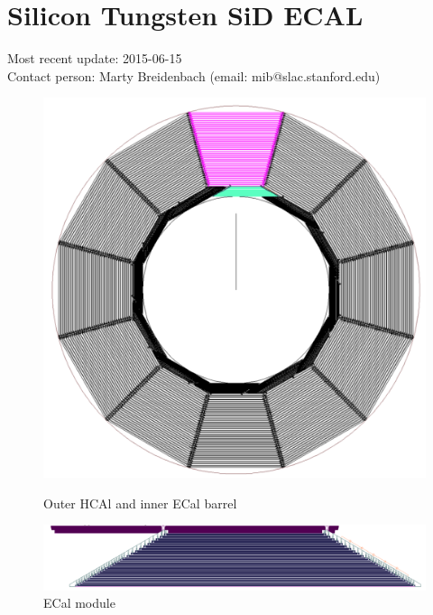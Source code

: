 \section{Silicon Tungsten SiD ECAL}\label{sec:Calorimeter:SiliconTungstenSiD}
Most recent update: 2015-06-15 \\
Contact person: Marty Breidenbach (email: mib@slac.stanford.edu)
\begin{figure}
	\centering
	\begin{minipage}[b]{.49\textwidth}
		\includegraphics[width=\linewidth]{Calorimeter/SiliconTungstenSiD/cross_section}
		\caption{Outer HCAl and inner ECal barrel}
		\label{fig:Calorimeter:SiDECAL:crosssection}
	\end{minipage}\hfill
	\begin{minipage}[b]{.49\textwidth}
		\includegraphics[width=\linewidth]{Calorimeter/SiliconTungstenSiD/ecalModule}
		\caption{ECal module}
		\label{fig:Calorimeter:SiDECAL:ecalModule}
	\end{minipage}
\end{figure}

